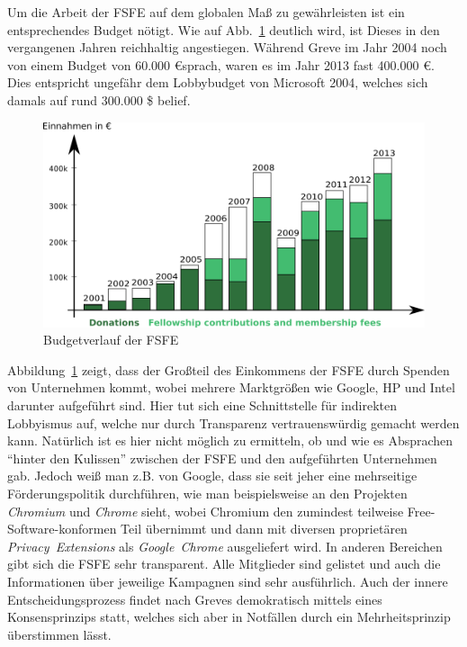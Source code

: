 Um die Arbeit der FSFE auf dem globalen Maß zu gewährleisten ist ein 
entsprechendes Budget nötigt. Wie auf Abb.~\ref{fig:finances_image} deutlich 
wird, ist Dieses in den vergangenen Jahren reichhaltig angestiegen. Während 
Greve 
im Jahr 2004 noch von einem Budget von 60.000 \euro sprach, waren es im Jahr 
2013 fast 400.000 \euro. Dies entspricht ungefähr dem Lobbybudget von Microsoft 
2004, welches sich damals auf rund 300.000 \$ belief.\cite{PLGreveInterView}
\begin{figure}[h]
    \includegraphics[width=\textwidth]{finanzen1}
    \centering
    \caption{Budgetverlauf der FSFE}
    \label{fig:finances_image}
\end{figure}
Abbildung~\ref{fig:finances_image} zeigt, dass der Großteil des Einkommens der 
FSFE durch Spenden von Unternehmen kommt, wobei mehrere Marktgrößen wie Google, 
HP und Intel darunter aufgeführt sind. Hier tut sich eine Schnittstelle für 
indirekten Lobbyismus auf, welche nur durch Transparenz vertrauenswürdig 
gemacht werden kann. Natürlich ist es hier nicht möglich zu ermitteln, ob und 
wie es Absprachen ``hinter den Kulissen'' zwischen der FSFE und den 
aufgeführten Unternehmen gab. Jedoch weiß man z.B. von Google, dass sie seit 
jeher 
eine mehrseitige Förderungspolitik durchführen, wie man beispielsweise an den 
Projekten \emph{Chromium} und \emph{Chrome} sieht, wobei Chromium den zumindest 
teilweise Free-Software-konformen Teil übernimmt und dann mit diversen 
proprietären 
\emph{Privacy~Extensions} als \emph{Google~Chrome} ausgeliefert wird. In 
anderen Bereichen 
gibt sich die FSFE sehr transparent. Alle Mitglieder sind 
gelistet und auch die Informationen über jeweilige Kampagnen sind sehr 
ausführlich. Auch der innere Entscheidungsprozess findet nach Greves 
\cite{PLGreveInterView} demokratisch mittels eines Konsensprinzips statt, 
welches sich aber in Notfällen durch ein Mehrheitsprinzip überstimmen lässt.

